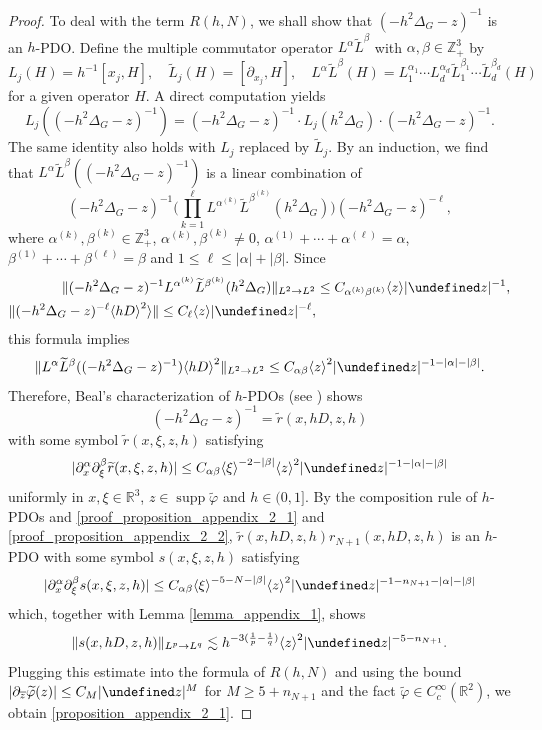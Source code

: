 \documentclass[10pt%
]{amsart}
\numberwithin{equation}{section}
\let\Im=\undefined\DeclareMathOperator*{\Im}{Im}
\newcommand{\R}{\mathbb{R}}
\newcommand{\Z}{\mathbb{Z}}
\theoremstyle{definition}
\def\<{{\langle}}
\def\>{{\rangle}}
\def\supp{\mathop{\mathrm{supp}}\nolimits}
\begin{document}
\begin{proof}
	To deal with the term $R(h,N)$, we shall show that $(-h^2\Delta_G-z)^{-1}$ is an $h$-PDO. Define the multiple commutator operator $L^\alpha \widetilde L^\beta$ with $\alpha,\beta\in \Z_+^3 $ by
	$$
	L_{j}(H)=h^{-1}[x_j,H],\quad \widetilde L_{j}(H)=[\partial_{x_j},H],\quad L^\alpha \widetilde L^\beta (H)=L_1^{\alpha_1}\cdots L_d^{\alpha_d}\widetilde L_1^{\beta_1}\cdots \widetilde L_d^{\beta_d}(H)
	$$
	for a given operator $H$. A direct computation yields
	$$
	L_j((-h^2\Delta_G-z)^{-1})=(-h^2\Delta_G-z)^{-1}\cdot L_j(h^2\Delta_G)\cdot (-h^2\Delta_G-z)^{-1}.
	$$
	The same identity also holds with $L_j$ replaced by $\widetilde L_j$. By an induction, we find that $L^\alpha \widetilde L^\beta ((-h^2\Delta_G-z)^{-1})$ is a linear combination of
	$$
	(-h^2\Delta_G-z)^{-1}\Big(\prod_{k=1}^\ell L^{\alpha^{(k)}}\widetilde L^{\beta^{(k)}}(h^2\Delta_G)\Big) (-h^2\Delta_G-z)^{-\ell},
	$$
	where $\alpha^{(k)},\beta^{(k)}\in \Z_+^3$, $\alpha^{(k)},\beta^{(k)}\neq0$, $\alpha^{(1)}+\cdots+\alpha^{(\ell)}=\alpha$, $\beta^{(1)}+\cdots+\beta^{(\ell)}=\beta$ and $1\le \ell\le |\alpha|+|\beta|$. Since 
	\begin{align*}
		\|(-h^2\Delta_G-z)^{-1}L^{\alpha^{(k)}}\widetilde L^{\beta^{(k)}}(h^2\Delta_G)\|_{L^2\to L^2}&\le C_{\alpha^{(k)}\beta^{(k)}}\<z\>|\Im z|^{-1},\\
		\|(-h^2\Delta_G-z)^{-\ell}\<hD\>^2\>\|\le C_\ell \<z\>|\Im z|^{-\ell},
	\end{align*}
	this formula implies
	$$
	\|L^\alpha \widetilde L^\beta ((-h^2\Delta_G-z)^{-1})\<hD\>^2\|_{L^2\to L^2}\le C_{\alpha\beta} \<z\>^2|\Im z|^{-1-|\alpha|-|\beta|}. 
	$$
	Therefore, Beal's characterization of $h$-PDOs (see \cite[Proposition 8.3]{DiSj}) shows $$(-h^2\Delta_G-z)^{-1}=\widetilde r(x,hD,z,h)$$ with some symbol $\widetilde r(x,\xi,z,h)$ satisfying
	\begin{align}
		\label{proof_proposition_appendix_2_2}
		|\partial_x^\alpha \partial_\xi^\beta \widetilde r(x,\xi,z,h)|\le C_{\alpha\beta}\<\xi\>^{-2-|\beta|}\<z\>^2|\Im z|^{-1-|\alpha|-|\beta|}
	\end{align}
	uniformly in $x,\xi\in \R^3$, $z\in \supp \widetilde \varphi$ and $h\in (0,1]$. By the composition rule of $h$-PDOs and \eqref{proof_proposition_appendix_2_1} and \eqref{proof_proposition_appendix_2_2}, $\widetilde r(x,hD,z,h)r_{N+1}(x,hD,z,h)$ is an $h$-PDO with some symbol $s(x,\xi,z,h)$ satisfying
	$$
	|\partial_x^\alpha \partial_\xi^\beta s(x,\xi,z,h)|\le C_{\alpha\beta}\<\xi\>^{-5-N-|\beta|}\<z\>^2|\Im z|^{-1-n_{N+1}-|\alpha|-|\beta|}
	$$
	which, together with Lemma \ref{lemma_appendix_1}, shows
	$$
	\|s(x,hD,z,h)\|_{L^p\to L^q}\lesssim h^{-3(\frac1p-\frac1q)}\<z\>^2|\Im z|^{-5-n_{N+1}}. 
	$$
	Plugging this estimate into the formula of $R(h,N)$ and using the bound $|\partial_{\overline z}\widetilde \varphi(z)|\le C_M|\Im z|^M$ for $M\ge 5+n_{N+1}$ and the fact $\widetilde \varphi \in C_c^\infty(\R^2)$, we obtain \eqref{proposition_appendix_2_1}. 
\end{proof}
\end{document}

